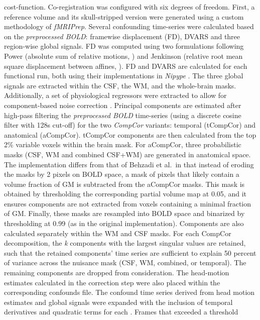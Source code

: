 \documentclass[
]{article}
\begin{document}
\begin{description}
\citep{bbr} cost-function. Co-registration was configured with six
degrees of freedom. First, a reference volume and its skull-stripped
version were generated using a custom methodology of \emph{fMRIPrep}.
Several confounding time-series were calculated based on the
\emph{preprocessed BOLD}: framewise displacement (FD), DVARS and three
region-wise global signals. FD was computed using two formulations
following Power (absolute sum of relative motions,
\citet{power_fd_dvars}) and Jenkinson (relative root mean square
displacement between affines, \citet{mcflirt}). FD and DVARS are
calculated for each functional run, both using their implementations in
\emph{Nipype} \citep[following the definitions by][]{power_fd_dvars}.
The three global signals are extracted within the CSF, the WM, and the
whole-brain masks. Additionally, a set of physiological regressors were
extracted to allow for component-based noise correction
\citep[\emph{CompCor},][]{compcor}. Principal components are estimated
after high-pass filtering the \emph{preprocessed BOLD} time-series
(using a discrete cosine filter with 128s cut-off) for the two
\emph{CompCor} variants: temporal (tCompCor) and anatomical (aCompCor).
tCompCor components are then calculated from the top 2\% variable voxels
within the brain mask. For aCompCor, three probabilistic masks (CSF, WM
and combined CSF+WM) are generated in anatomical space. The
implementation differs from that of Behzadi et al.~in that instead of
eroding the masks by 2 pixels on BOLD space, a mask of pixels that
likely contain a volume fraction of GM is subtracted from the aCompCor
masks. This mask is obtained by thresholding the corresponding partial
volume map at 0.05, and it ensures components are not extracted from
voxels containing a minimal fraction of GM. Finally, these masks are
resampled into BOLD space and binarized by thresholding at 0.99 (as in
the original implementation). Components are also calculated separately
within the WM and CSF masks. For each CompCor decomposition, the
\emph{k} components with the largest singular values are retained, such
that the retained components' time series are sufficient to explain 50
percent of variance across the nuisance mask (CSF, WM, combined, or
temporal). The remaining components are dropped from consideration. The
head-motion estimates calculated in the correction step were also placed
within the corresponding confounds file. The confound time series
derived from head motion estimates and global signals were expanded with
the inclusion of temporal derivatives and quadratic terms for each
\citep{confounds_satterthwaite_2013}. Frames that exceeded a threshold

\end{description}
\end{document}
